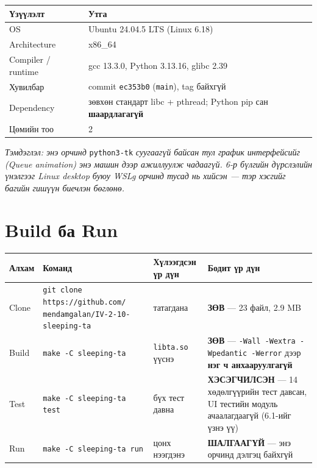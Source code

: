\documentclass[11pt,a4paper]{article}
\begin{document}
\begin{center}
\small
\begin{tabular}{lL{9.5cm}}
\toprule
Үзүүлэлт & Утга \\
\midrule
OS & Ubuntu 24.04.5 LTS (Linux 6.18) \\
Architecture & x86\_64 \\
Compiler / runtime & gcc 13.3.0, Python 3.13.16, glibc 2.39 \\
Хувилбар & commit \texttt{ec353b0} (\texttt{main}), tag байхгүй \\
Dependency & зөвхөн стандарт libc + pthread; Python pip сан \textbf{шаардлагагүй} \\
Цөмийн тоо & 2 \\
\bottomrule
\end{tabular}
\end{center}

\emph{Тэмдэглэл: энэ орчинд} \texttt{python3-tk} \emph{суугаагүй байсан тул
график интерфейсийг (Queue animation) энэ машин дээр ажиллуулж чадаагүй.
6-р бүлгийн дүрслэлийн үнэлгээг Linux desktop буюу WSLg орчинд тусад нь
хийсэн --- тэр хэсгийг багийн гишүүн биечлэн бөглөнө.}

\section{Build ба Run}

\begin{center}
\small
\begin{tabular}{L{1.7cm}L{5.9cm}L{3.4cm}L{3.4cm}}
\toprule
Алхам & Команд & Хүлээгдсэн үр дүн & Бодит үр дүн \\
\midrule
Clone & \texttt{git clone https://github.com/} \texttt{mendamgalan/IV-2-10-sleeping-ta} &
татагдана & \textbf{ЗӨВ} --- 23 файл, 2.9 MB \\[6pt]
Build & \texttt{make -C sleeping-ta} &
\texttt{libta.so} үүснэ & \textbf{ЗӨВ} --- \texttt{-Wall -Wextra -Wpedantic -Werror} дээр \textbf{нэг ч анхааруулгагүй} \\[6pt]
Test & \texttt{make -C sleeping-ta test} &
бүх тест давна & \textbf{ХЭСЭГЧИЛСЭН} --- 14 хөдөлгүүрийн тест давсан, UI тестийн модуль ачаалагдаагүй (6.1-ийг үзнэ үү) \\[6pt]
Run & \texttt{make -C sleeping-ta run} &
цонх нээгдэнэ & \textbf{ШАЛГААГҮЙ} --- энэ орчинд дэлгэц байхгүй \\
\bottomrule
\end{tabular}
\end{center}
\end{document}
